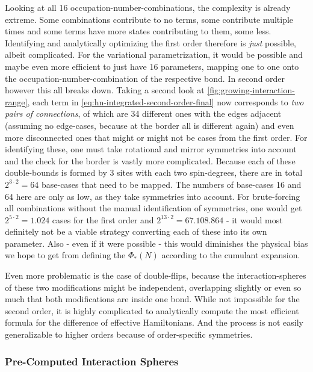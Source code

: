 Looking at all 16 occupation-number-combinations, the complexity is already extreme. 
Some combinations contribute to no terms, some contribute multiple times and some terms have more states contributing to them, some less.
Identifying and analytically optimizing the first order therefore is \emph{just} possible, albeit complicated.
For the variational parametrization, it would be possible and maybe even more efficient to just have 16 parameters, mapping one to one onto the occupation-number-combination of the respective bond. 
In second order however this all breaks down.
Taking a second look at \autoref{fig:growing-interaction-range}, each term in \autoref{eq:hn-integrated-second-order-final} now corresponds to \emph{two pairs of connections}, of which are 34 different ones with the edges adjacent (assuming no edge-cases, because at the border all is different again) and even more disconnected ones that might or might not be cases from the first order.
For identifying these, one must take rotational and mirror symmetries into account and the check for the border is vastly more complicated.
Because each of these double-bounds is formed by 3 sites with each two spin-degrees, there are in total $2^{3\cdot 2} = 64$ base-cases that need to be mapped.
The numbers of base-cases 16 and 64 here are only as low, as they take symmetries into account. 
For brute-forcing all combinations without the manual identification of symmetries, one would get $2^{5\cdot 2} = 1.024$ cases for the first order and $2^{13\cdot 2} = 67.108.864$ - it would most definitely not be a viable strategy converting each of these into its own parameter.
Also - even if it were possible - this would diminishes the physical bias we hope to get from defining the $\Phi_\ast(N)$ according to the cumulant expansion.

Even more problematic is the case of double-flips, because the interaction-spheres of these two modifications might be independent, overlapping slightly or even so much that both modifications are inside one bond.
While not impossible for the second order, it is highly complicated to analytically compute the most efficient formula for the difference of effective Hamiltonians.
And the process is not easily generalizable to higher orders because of order-specific symmetries.


\subsubsection*{Pre-Computed Interaction Spheres}

